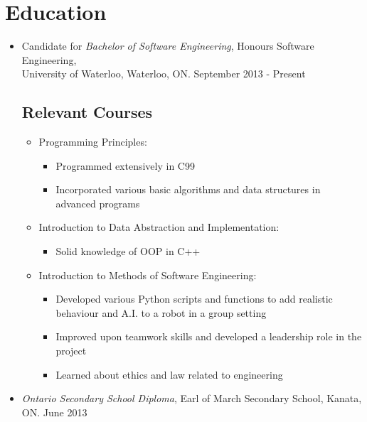 \documentclass[12pt]{article}
\begin{document}
\section*{Education} \vspace{-12pt}
	\begin{itemize}
	\item Candidate for \textit{Bachelor of Software Engineering}, Honours Software Engineering, \\University of Waterloo, Waterloo, ON. September 2013 - Present \vspace*{-18pt}
		\subsection*{Relevant Courses} \vspace*{-10pt}
			\begin{itemize}
			\item Programming Principles:
				\begin{itemize}
				\item Programmed extensively in C99
				\item Incorporated various basic algorithms and data structures in advanced programs
				\end{itemize}
			\item Introduction to Data Abstraction and Implementation:
				\begin{itemize}
				\item Solid knowledge of OOP in C++
				\end{itemize}									
			\item Introduction to Methods of Software Engineering:
				\begin{itemize}
				\item Developed various Python scripts and functions to add realistic behaviour and A.I. to a robot in a group setting
				\item Improved upon teamwork skills and developed a leadership role in the project 				
				\item Learned about ethics and law related to engineering 
				\end{itemize}			
			\end{itemize}
		\item \textit{Ontario Secondary School Diploma}, Earl of March Secondary School, Kanata, ON. June 2013
		\end{itemize}
\end{document}
